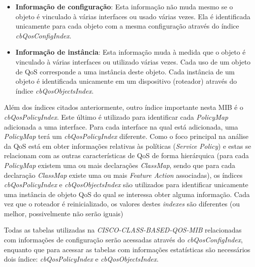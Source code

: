 \begin{itemize}
	\item \textbf{Informação de configuração}: Esta informação não muda mesmo se o objeto é vinculado à várias interfaces ou usado várias vezes. Ela é identificada unicamente para cada objeto com a mesma configuração através do índice \textit{cbQosConfigIndex}.
	
	\item \textbf{Informação de instância}: Esta informação muda à medida que o objeto é vinculado à várias interfaces ou utilizado várias vezes. Cada uso de um objeto de QoS corresponde a uma instância deste objeto. Cada instância de um objeto é identificada unicamente em um dispositivo (roteador) através do índice \textit{cbQosObjectsIndex}.
\end{itemize}

	Além dos índices citados anteriormente, outro índice importante nesta MIB é o \textit{cbQosPolicyIndex}. Este último é utilizado para identificar cada \textit{PolicyMap} adicionada a uma interface. Para cada interface na qual está adicionada, uma \textit{PolicyMap} terá um \textit{cbQosPolicyIndex} diferente. Como o foco principal na análise da QoS está em obter informações relativas às políticas (\textit{Service Policy}) e estas se relacionam com as outras características de QoS de forma hierárquica (para cada \textit{PolicyMap} existem uma ou mais declarações \textit{ClassMap}, sendo que para cada declaração \textit{ClassMap} existe uma ou mais \textit{Feature Action} associadas), os índices \textit{cbQosPolicyIndex} e \textit{cbQosObjectsIndex} são utilizados para identificar unicamente uma instância de objeto QoS do qual se interessa obter alguma informação. Cada vez que o roteador é reinicializado, os valores destes \textit{indexes} são diferentes (ou melhor, possivelmente não serão iguais)

	Todas as tabelas utilizadas na \textit{CISCO-CLASS-BASED-QOS-MIB} relacionadas com informações de configuração serão acessadas através do \textit{cbQosConfigIndex}, enquanto que para acessar as tabelas com informações estatísticas são necessários dois índice: \textit{cbQosPolicyIndex} e \textit{cbQosObjectsIndex}.